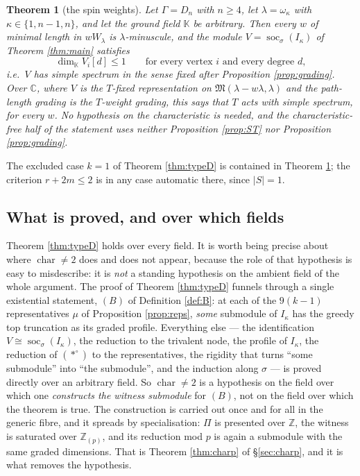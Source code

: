 \documentclass[reqno]{amsart}
\theoremstyle{plain}
\newtheorem{theorem}{Theorem}[section]
\theoremstyle{definition}
\DeclareMathOperator{\soc}{soc}
\newcommand{\la}{\lambda}
\newcommand{\om}{\omega}
\newcommand{\ka}{\kappa}
\newcommand{\Pia}{\Pi}
\begin{document}
\begin{theorem}[the spin weights]\label{thm:spin}
Let $\Gamma=D_n$ with $n\ge4$, let $\la=\om_\ka$ with $\ka\in\{1,n-1,n\}$, and
let the ground field $\mathbb{K}$ be arbitrary.  Then every $w$ of minimal
length in $wW_\la$ is $\la$-minuscule, and the module
$V=\soc_\sigma(I_\ka)$ of Theorem \ref{thm:main} satisfies
\[
   \dim_{\mathbb{K}}V_i[d]\le1\qquad\text{for every vertex } i
   \text{ and every degree } d,
\]
i.e.\ $V$ has simple spectrum in the sense fixed after Proposition
\ref{prop:grading}.  Over $\mathbb{C}$, where $V$ is the $T$-fixed
representation on $\mathfrak{M}(\la-w\la,\la)$ and the path-length grading is
the $T$-weight grading, this says that $T$ acts with simple spectrum, for
every $w$.  No hypothesis on the characteristic is needed, and the
characteristic-free half of the statement uses neither Proposition
\ref{prop:ST} nor Proposition \ref{prop:grading}.
\end{theorem}

The excluded case $k=1$ of Theorem \ref{thm:typeD} is contained in Theorem
\ref{thm:spin}; the criterion $r+2m\le2$ is in any case automatic there, since
$|S|=1$.

\subsection{What is proved, and over which fields}\label{ss:scope}
Theorem \ref{thm:typeD} holds over every field.  It is worth being precise
about where $\operatorname{char}\ne2$ does and does not appear, because the
role of that hypothesis is easy to misdescribe: it is \emph{not} a standing
hypothesis on the ambient field of the whole argument.  The proof of Theorem \ref{thm:typeD} funnels
through a single existential statement, $(B)$ of Definition \ref{def:B}: at
each of the $9(k-1)$ representatives $\mu$ of Proposition \ref{prop:reps},
\emph{some} submodule of $I_\ka$ has the greedy top truncation as its graded
profile.  Everything else --- the identification $V\cong\soc_\sigma(I_\ka)$,
the reduction to the trivalent node, the profile of $I_\ka$, the reduction of
$(*^\circ)$ to the representatives, the rigidity that turns ``some submodule''
into ``the submodule'', and the induction along $\sigma$ --- is proved directly
over an arbitrary field.  So $\operatorname{char}\ne2$ is a hypothesis on the
field over which one \emph{constructs the witness submodule} for $(B)$, not on
the field over which the theorem is true.  The construction is carried out once
and for all in the generic fibre, and it spreads by specialisation:
$\Pia$ is presented over $\mathbb{Z}$, the witness is saturated over
$\mathbb{Z}_{(p)}$, and its reduction mod $p$ is again a submodule with the
same graded dimensions.  That is Theorem \ref{thm:charp} of
\S\ref{sec:charp}, and it is what removes the hypothesis.
\end{document}
